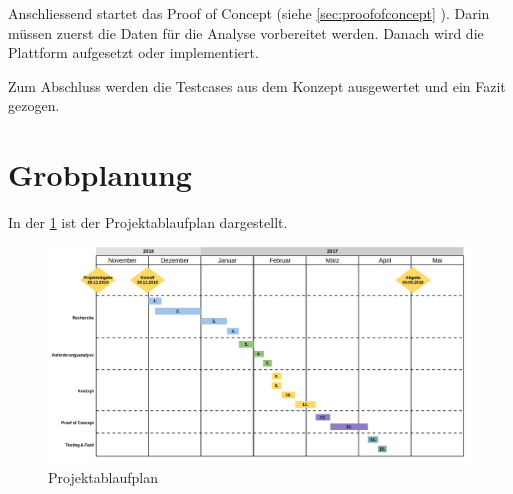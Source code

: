 Anschliessend startet das Proof of Concept (siehe \cref{sec:proofofconcept} ). Darin müssen zuerst die Daten für die Analyse vorbereitet werden. Danach wird die Plattform aufgesetzt oder implementiert.

Zum Abschluss werden die Testcases aus dem Konzept ausgewertet und ein Fazit gezogen.

\section{Grobplanung}
In der \cref{fig:einleitung:projektablaufplan}  ist der Projektablaufplan dargestellt.
\begin{figure}
	\centering
	\includegraphics[width=1\textwidth]{images/projektablaufplan.png}
	\caption{Projektablaufplan}
	\label{fig:einleitung:projektablaufplan}
\end{figure}
\\\\
